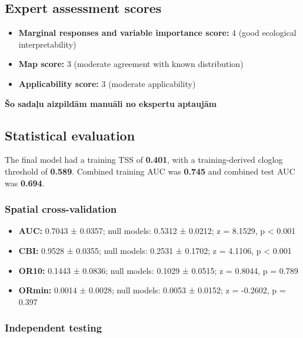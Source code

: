 \documentclass[
  openany]{book}
\providecommand{\tightlist}{%
  \setlength{\itemsep}{0pt}\setlength{\parskip}{0pt}}
\providecommand{\tightlist}{%
  \setlength{\itemsep}{0pt}%
  \setlength{\parskip}{0pt}%
}
\begin{document}
\subsection*{Expert assessment scores}\label{expert-assessment-scores-26}

\begin{itemize}
\tightlist
\item
  \textbf{Marginal responses and variable importance score:} 4 (good ecological interpretability)
\item
  \textbf{Map score:} 3 (moderate agreement with known distribution)
\item
  \textbf{Applicability score:} 3 (moderate applicability)
\end{itemize}

\textbf{Šo sadaļu aizpildām manuāli no ekspertu aptaujām}

\subsection*{Statistical evaluation}\label{statistical-evaluation-26}

The final model had a training TSS of \textbf{0.401}, with a training-derived cloglog threshold of \textbf{0.589}. Combined training AUC was \textbf{0.745} and combined test AUC was \textbf{0.694}.

\subsubsection*{Spatial cross-validation}\label{spatial-cross-validation-26}

\begin{itemize}
\tightlist
\item
  \textbf{AUC:} 0.7043 ± 0.0357; null models: 0.5312 ± 0.0212; z = 8.1529, p \textless{} 0.001
\item
  \textbf{CBI:} 0.9528 ± 0.0355; null models: 0.2531 ± 0.1702; z = 4.1106, p \textless{} 0.001
\item
  \textbf{OR10:} 0.1443 ± 0.0836; null models: 0.1029 ± 0.0515; z = 0.8044, p = 0.789
\item
  \textbf{ORmin:} 0.0014 ± 0.0028; null models: 0.0053 ± 0.0152; z = -0.2602, p = 0.397
\end{itemize}

\subsubsection*{Independent testing}\label{independent-testing-25}
\end{document}
